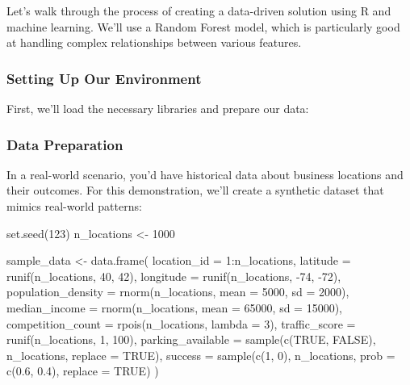 \documentclass[
  letterpaper,
  DIV=11,
  numbers=noendperiod]{scrartcl}
\newenvironment{Shaded}{\begin{snugshade}}{\end{snugshade}}
\newcommand{\AttributeTok}[1]{\textcolor[rgb]{0.40,0.45,0.13}{#1}}
\newcommand{\ConstantTok}[1]{\textcolor[rgb]{0.56,0.35,0.01}{#1}}
\newcommand{\DecValTok}[1]{\textcolor[rgb]{0.68,0.00,0.00}{#1}}
\newcommand{\FloatTok}[1]{\textcolor[rgb]{0.68,0.00,0.00}{#1}}
\newcommand{\FunctionTok}[1]{\textcolor[rgb]{0.28,0.35,0.67}{#1}}
\newcommand{\NormalTok}[1]{\textcolor[rgb]{0.00,0.23,0.31}{#1}}
\newcommand{\OtherTok}[1]{\textcolor[rgb]{0.00,0.23,0.31}{#1}}
\newcommand{\SpecialCharTok}[1]{\textcolor[rgb]{0.37,0.37,0.37}{#1}}
\begin{document}
Let's walk through the process of creating a data-driven solution using
R and machine learning. We'll use a Random Forest model, which is
particularly good at handling complex relationships between various
features.

\subsubsection{Setting Up Our
Environment}\label{setting-up-our-environment}

First, we'll load the necessary libraries and prepare our data:

\subsubsection{Data Preparation}\label{data-preparation}

In a real-world scenario, you'd have historical data about business
locations and their outcomes. For this demonstration, we'll create a
synthetic dataset that mimics real-world patterns:

\begin{Shaded}
\begin{Highlighting}[]
\FunctionTok{set.seed}\NormalTok{(}\DecValTok{123}\NormalTok{)}
\NormalTok{n\_locations }\OtherTok{\textless{}{-}} \DecValTok{1000}

\NormalTok{sample\_data }\OtherTok{\textless{}{-}} \FunctionTok{data.frame}\NormalTok{(}
  \AttributeTok{location\_id =} \DecValTok{1}\SpecialCharTok{:}\NormalTok{n\_locations,}
  \AttributeTok{latitude =} \FunctionTok{runif}\NormalTok{(n\_locations, }\DecValTok{40}\NormalTok{, }\DecValTok{42}\NormalTok{),}
  \AttributeTok{longitude =} \FunctionTok{runif}\NormalTok{(n\_locations, }\SpecialCharTok{{-}}\DecValTok{74}\NormalTok{, }\SpecialCharTok{{-}}\DecValTok{72}\NormalTok{),}
  \AttributeTok{population\_density =} \FunctionTok{rnorm}\NormalTok{(n\_locations, }\AttributeTok{mean =} \DecValTok{5000}\NormalTok{, }\AttributeTok{sd =} \DecValTok{2000}\NormalTok{),}
  \AttributeTok{median\_income =} \FunctionTok{rnorm}\NormalTok{(n\_locations, }\AttributeTok{mean =} \DecValTok{65000}\NormalTok{, }\AttributeTok{sd =} \DecValTok{15000}\NormalTok{),}
  \AttributeTok{competition\_count =} \FunctionTok{rpois}\NormalTok{(n\_locations, }\AttributeTok{lambda =} \DecValTok{3}\NormalTok{),}
  \AttributeTok{traffic\_score =} \FunctionTok{runif}\NormalTok{(n\_locations, }\DecValTok{1}\NormalTok{, }\DecValTok{100}\NormalTok{),}
  \AttributeTok{parking\_available =} \FunctionTok{sample}\NormalTok{(}\FunctionTok{c}\NormalTok{(}\ConstantTok{TRUE}\NormalTok{, }\ConstantTok{FALSE}\NormalTok{), n\_locations, }\AttributeTok{replace =} \ConstantTok{TRUE}\NormalTok{),}
  \AttributeTok{success =} \FunctionTok{sample}\NormalTok{(}\FunctionTok{c}\NormalTok{(}\DecValTok{1}\NormalTok{, }\DecValTok{0}\NormalTok{), n\_locations, }\AttributeTok{prob =} \FunctionTok{c}\NormalTok{(}\FloatTok{0.6}\NormalTok{, }\FloatTok{0.4}\NormalTok{), }\AttributeTok{replace =} \ConstantTok{TRUE}\NormalTok{)}
\NormalTok{)}
\end{Highlighting}
\end{Shaded}
\end{document}
